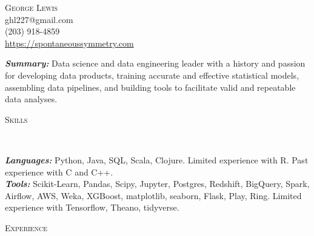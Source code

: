 \documentclass[9pt]{article}
\newenvironment{changemargin}[2]{%
  \begin{list}{}{%
    \setlength{\topsep}{0pt}%
    \setlength{\leftmargin}{#1}%
    \setlength{\rightmargin}{#2}%
    \setlength{\listparindent}{\parindent}%
    \setlength{\itemindent}{\parindent}%
    \setlength{\parsep}{\parskip}%
  }%
  \item[]}{\end{list}
}
\newcommand{\lineover}{
  \begin{changemargin}{-0.05in}{-0.05in}
    \vspace*{-8pt}
    \hrulefill \\
    \vspace*{-2pt}
  \end{changemargin}
}
\newcommand{\header}[1]{
  \begin{changemargin}{-0.5in}{-0.5in}
    \scshape{#1}\\
    \lineover
  \end{changemargin}
}
\newcommand{\contact}[4]{
  \begin{changemargin}{-0.5in}{-0.5in}
    \begin{center}
      {\Large \scshape {#1}}\\ \smallskip
      {#2}\\ \smallskip
      {#3}\\ \smallskip
      {#4}\smallskip
    \end{center}
  \end{changemargin}
}
\newenvironment{body} {
  \vspace*{-16pt}
\begin{changemargin}{-0.25in}{-0.5in}
  }
{\end{changemargin}
}
\begin{document}
\contact{George Lewis}
        {ghl227@gmail.com}
        {(203) 918-4859}
        {\url{https://spontaneoussymmetry.com}}
\smallskip

\begin{body}
  \vspace{14pt}
  \emph{\textbf{Summary:}}{} Data science and data engineering leader with a history and passion for developing data products, training accurate and effective statistical models, assembling data pipelines, and building tools to facilitate valid and repeatable data analyses.
\end{body}

\smallskip

\header{Skills}
\begin{body}
  \vspace{14pt}
  \emph{\textbf{Languages:}}{} Python, Java, SQL, Scala, Clojure.  Limited experience with R.  Past experience with C and C++. \\
  \smallskip
  \emph{\textbf{Tools:}}{} Scikit-Learn, Pandas, Scipy, Jupyter, Postgres, Redshift, BigQuery, Spark, Airflow, AWS, Weka, XGBoost, matplotlib, seaborn, Flask, Play, Ring.  Limited experience with Tensorflow, Theano, tidyverse.  \\
\end{body}

\smallskip

\header{Experience}
\end{document}
